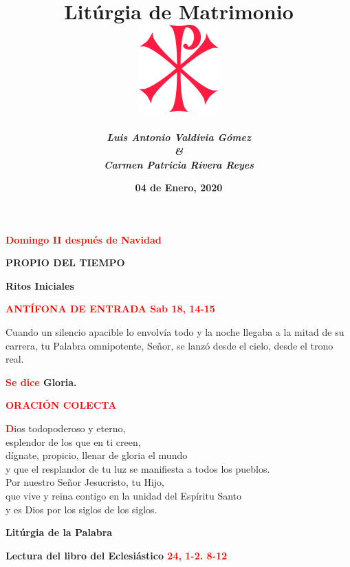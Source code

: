 \documentclass[12pt, letterpaper]{report}
\title{
  \Huge \bfseries Lit\'urgia de Matrimonio \\
  \vspace{1em}
  \includegraphics{cruz_cristo}
}
\author{
  \Large \em \bfseries Luis Antonio Valdivia G\'omez \\
  \Large \em \bfseries \& \\
  \Large \em \bfseries Carmen Patricia Rivera Reyes
}
\date{\bfseries 04 de Enero, 2020}
\begin{document}
  \maketitle

  \begin{center}
    \Large {\bfseries \textcolor{red}{Domingo II despu\'es de Navidad}}
  \end{center}

  \begin{center}
    \Huge {\bfseries PROPIO DEL TIEMPO} \\
  \end{center}

  \begin{center}
    \Huge {\bfseries Ritos Iniciales}
  \end{center}

  \Large {\bfseries \textcolor{red}{ANT\'IFONA DE ENTRADA \hspace{1cm} Sab 18, 14-15} }

  \Large {Cuando un silencio apacible lo envolv\'ia todo y la noche llegaba a la mitad de su carrera, tu Palabra omnipotente, Se\~nor, se lanz\'o desde el cielo, desde el trono real.}

  \Large {\bfseries \textcolor{red}{Se dice} Gloria.}

  \Large {\bfseries \textcolor{red}{ORACI\'ON COLECTA}}

  \lettrine[lines=2]{\bfseries \textcolor{red}{D}}{}\Large {ios todopoderoso y eterno, \\
  esplendor de los que en ti creen, \\
  d\'ignate, propicio, llenar de gloria el mundo \\
  y que el resplandor de tu luz se manifiesta a todos los pueblos. \\
  Por nuestro Se\~nor Jesucristo, tu Hijo, \\
  que vive y reina contigo en la unidad del Esp\'iritu Santo \\
  y es Dios por los siglos de los siglos.}

  \clearpage

  \begin{center}
    \Huge {\bfseries Lit\'urgia de la Palabra}
  \end{center}

  \Large {\bfseries Lectura del libro del Eclesi\'astico \hspace{1cm} \textcolor{red}{24, 1-2. 8-12}}
\end{document}
